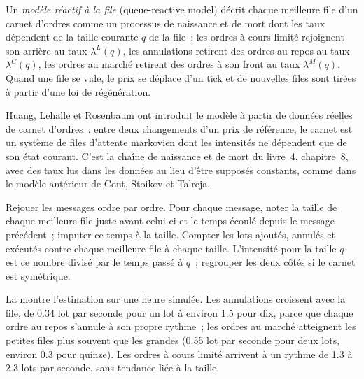 \begin{definition}\label{def:hf:queue-reactive-models-and-large-tick-assets:qr}
Un \emph{modèle réactif à la file} (queue-reactive model) décrit chaque meilleure file d'un carnet d'ordres comme un processus de naissance et de mort dont les taux dépendent de la
taille courante $q$ de la file~: les ordres à cours limité rejoignent son arrière au taux $\lambda^L(q)$, les annulations retirent des ordres au repos au taux $\lambda^C(q)$, les ordres au marché
retirent des ordres à son front au taux $\lambda^M(q)$. Quand une file se vide, le prix se déplace d'un tick et de nouvelles files sont tirées à partir
d'une loi de régénération.
\end{definition}

Huang, Lehalle et Rosenbaum ont introduit le modèle à partir de données réelles de carnet d'ordres~: entre deux changements d'un prix de référence, le carnet est un système de files d'attente
markovien dont les intensités ne dépendent que de son état courant. C'est la chaîne de naissance et de mort du livre~4, chapitre~8, avec des taux lus dans les
données au lieu d'être supposés constants, comme dans le modèle antérieur de Cont, Stoikov et Talreja.

\begin{method}\label{met:hf:queue-reactive-models-and-large-tick-assets:estimate}
Rejouer les messages ordre par ordre. Pour chaque message, noter la taille de chaque meilleure file juste avant celui-ci et le temps écoulé depuis le message précédent~;
imputer ce temps à la taille. Compter les lots ajoutés, annulés et exécutés contre chaque meilleure file à chaque taille. L'intensité pour la taille $q$
est ce nombre divisé par le temps passé à $q$~; regrouper les deux côtés si le carnet est symétrique.
\end{method}

La  montre l'estimation sur une heure simulée. Les annulations croissent avec la file,
de 0.34 lot par seconde pour un lot à environ 1.5 pour dix, parce que chaque ordre au repos s'annule à son propre rythme~; les ordres au marché atteignent les petites files plus
souvent que les grandes (0.55 lot par seconde pour deux lots, environ 0.3 pour quinze). Les ordres à cours limité arrivent à un rythme de 1.3 à 2.3 lots par seconde, sans tendance liée à la taille.

